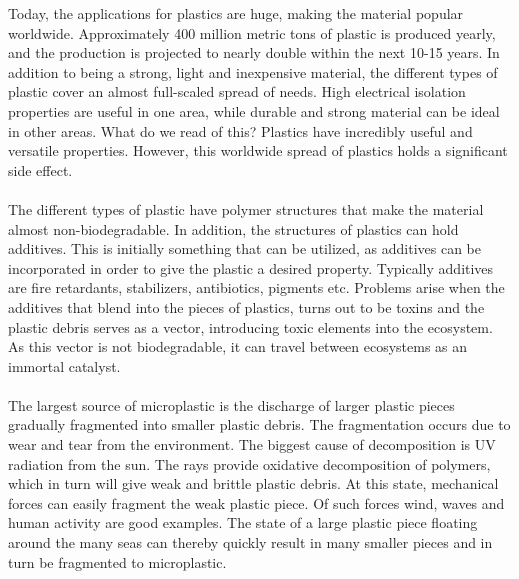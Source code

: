 Today, the applications for plastics are huge, making the material popular worldwide. %
Approximately 400 million metric tons of plastic is produced yearly, and the production is projected to nearly double within the next 10-15 years. %
In addition to being a strong, light and inexpensive material, the different types of plastic cover an almost full-scaled spread of needs. High electrical isolation properties are useful in one area, while durable and strong material can be ideal in other areas. What do we read of this? Plastics have incredibly useful and versatile properties. However, this worldwide spread of plastics holds a significant side effect. 
\\\\
The different types of plastic have polymer structures that make the material almost non-biodegradable. In addition, the structures of plastics can hold additives. This is initially something that can be utilized, as additives can be incorporated in order to give the plastic a desired property. Typically additives are fire retardants, stabilizers, antibiotics, pigments etc. %
Problems arise when the additives that blend into the pieces of plastics, turns out to be toxins and the plastic debris serves as a vector, introducing toxic elements into the ecosystem. As this vector is not biodegradable, it can travel between ecosystems as an immortal catalyst.
\\\\
The largest source of microplastic is the discharge of larger plastic pieces gradually fragmented into smaller plastic debris. The fragmentation occurs due to wear and tear from the environment. The biggest cause of decomposition is UV radiation from the sun. The rays provide oxidative decomposition of polymers, which in turn will give weak and brittle plastic debris. At this state, mechanical forces can easily fragment the weak plastic piece. Of such forces wind, waves and human activity are good examples. The state of a large plastic piece floating around the many seas can thereby quickly result in many smaller pieces and in turn be fragmented to microplastic.
\\\\
